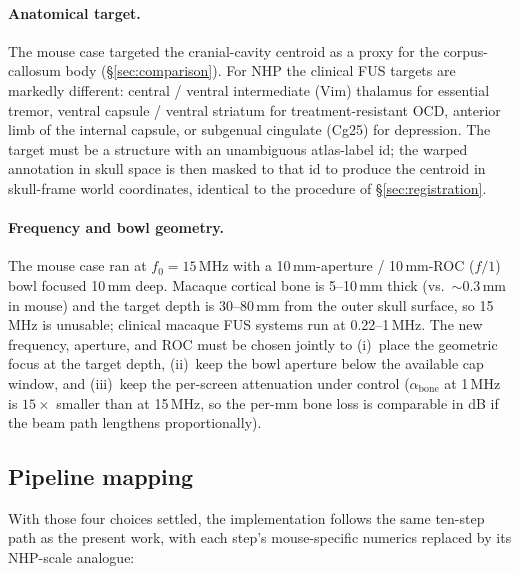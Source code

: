 \documentclass{compactarticle}
\begin{document}
\paragraph{Anatomical target.} The mouse case targeted the
cranial-cavity centroid as a proxy for the corpus-callosum body
(\S\ref{sec:comparison}). For NHP the clinical FUS targets are
markedly different: central / ventral intermediate (Vim) thalamus
for essential tremor, ventral capsule / ventral striatum for
treatment-resistant OCD, anterior limb of the internal capsule, or
subgenual cingulate (Cg25) for depression. The target must be a
structure with an unambiguous atlas-label id; the warped annotation
in skull space is then masked to that id to produce the centroid in
skull-frame world coordinates, identical to the procedure of
\S\ref{sec:registration}.

\paragraph{Frequency and bowl geometry.} The mouse case ran at
$f_0 = 15$\,MHz with a 10\,mm-aperture / 10\,mm-ROC ($f/1$) bowl
focused 10\,mm deep. Macaque cortical bone is 5--10\,mm thick (vs.\
$\sim 0.3$\,mm in mouse) and the target depth is 30--80\,mm from
the outer skull surface, so 15\,MHz is unusable; clinical macaque
FUS systems run at 0.22--1\,MHz. The new frequency, aperture, and
ROC must be chosen jointly to (i)~place the geometric focus at the
target depth, (ii)~keep the bowl aperture below the available cap
window, and (iii)~keep the per-screen attenuation under control
($\alpha_{\mathrm{bone}}$ at 1\,MHz is $15\times$ smaller than
at 15\,MHz, so the per-mm bone loss is comparable in dB if the
beam path lengthens proportionally).

\subsection*{Pipeline mapping}

With those four choices settled, the implementation follows the same
ten-step path as the present work, with each step's mouse-specific
numerics replaced by its NHP-scale analogue:
\end{document}
